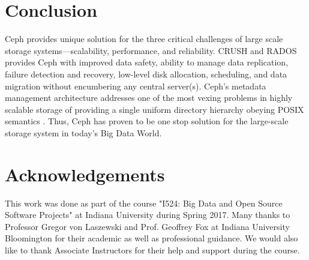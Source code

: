 \documentclass[9pt,twocolumn,twoside]{../../styles/osajnl}
\begin{document}
\section{Conclusion}
Ceph provides unique solution for the three critical challenges of
large scale storage systems—scalability, performance, and
reliability. CRUSH and RADOS provides Ceph with improved data safety,
ability to manage data replication, failure detection and recovery,
low-level disk allocation, scheduling, and data migration without
encumbering any central server(s). Ceph’s metadata management
architecture addresses one of the most vexing problems in highly
scalable storage of providing a single uniform directory hierarchy
obeying POSIX semantics \cite{paper-Ceph}. Thus, Ceph has proven to be
one stop solution for the large-scale storage system in today's Big
Data World.

\section*{Acknowledgements}

This work was done as part of the course "I524: Big Data and Open
Source Software Projects" at Indiana University during Spring
2017. Many thanks to Professor Gregor von Laszewski and Prof. Geoffrey
Fox at Indiana University Bloomington for their academic as well as
professional guidance. We would also like to thank Associate
Instructors for their help and support during the course.


\end{document}
